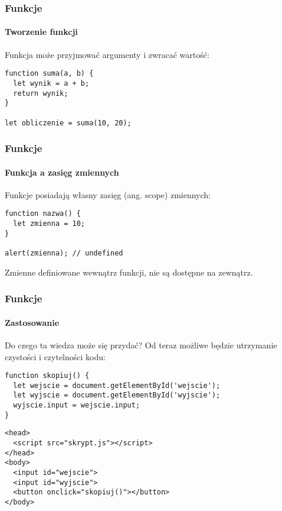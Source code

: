 \begin{frame}[fragile]
  \frametitle{Funkcje}
  \framesubtitle{Tworzenie funkcji}

  Funkcja może przyjmować argumenty i zwracać wartość:

  \begin{verbatim}
function suma(a, b) {
  let wynik = a + b;
  return wynik;
}

let obliczenie = suma(10, 20);
  \end{verbatim}

\end{frame}


\begin{frame}[fragile]
  \frametitle{Funkcje}
  \framesubtitle{Funkcja a zasięg zmiennych}

  Funkcje posiadają własny zasięg (ang. scope) zmiennych:

  \begin{verbatim}
function nazwa() {
  let zmienna = 10;
}

alert(zmienna); // undefined
  \end{verbatim}

  Zmienne definiowane wewnątrz funkcji, nie są dostępne na zewnątrz.

\end{frame}


\begin{frame}[fragile]
  \frametitle{Funkcje}
  \framesubtitle{Zastosowanie}

  Do czego ta wiedza może się przydać? Od teraz możliwe będzie utrzymanie czystości i czytelności kodu:

  \begingroup
    \footnotesize

  \begin{verbatim}
function skopiuj() {
  let wejscie = document.getElementById('wejscie');
  let wyjscie = document.getElementById('wyjscie');
  wyjscie.input = wejscie.input;
}
  \end{verbatim}

  \begin{verbatim}
<head>
  <script src="skrypt.js"></script>
</head>
<body>
  <input id="wejscie">
  <input id="wyjscie">
  <button onclick="skopiuj()"></button>
</body>
  \end{verbatim}

  \endgroup

\end{frame}
